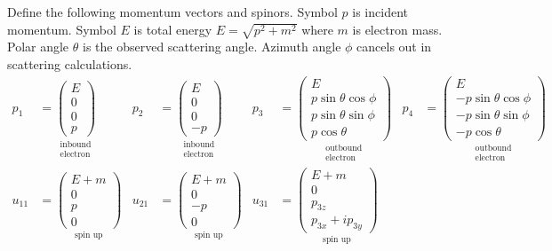 \documentclass[12pt]{article}
\begin{document}
Define the following momentum vectors and spinors.
Symbol $p$ is incident momentum.
Symbol $E$ is total energy $E=\sqrt{p^2+m^2}$ where $m$ is electron mass.
Polar angle $\theta$ is the observed scattering angle.
Azimuth angle $\phi$ cancels out in scattering calculations.
\begin{align*}
p_1&=
\underset{\substack{\text{inbound}\\\text{electron}}}
{
\begin{pmatrix}E\\0\\0\\p\end{pmatrix}
}
&
p_2&=
\underset{\substack{\text{inbound}\\\text{electron}}}
{
\begin{pmatrix}E\\0\\0\\-p\end{pmatrix}
}
&
p_3&=
\underset{\substack{\text{outbound}\\\text{electron}}}
{
\begin{pmatrix}
E\\
p\sin\theta\cos\phi\\
p\sin\theta\sin\phi\\
p\cos\theta
\end{pmatrix}
}
&
p_4&=
\underset{\substack{\text{outbound}\\\text{electron}}}
{
\begin{pmatrix}
E\\
-p\sin\theta\cos\phi\\
-p\sin\theta\sin\phi\\
-p\cos\theta
\end{pmatrix}
}
\\[1ex]
u_{11}&=
\underset{\text{spin up}}
{\begin{pmatrix}E+m\\0\\p\\0\end{pmatrix}}
&
u_{21}&=
\underset{\text{spin up}}
{\begin{pmatrix}E+m\\0\\-p\\0\end{pmatrix}}
&
u_{31}&=
\underset{\text{spin up}}
{\begin{pmatrix}E+m\\0\\p_{3z}\\p_{3x}+ip_{3y}\end{pmatrix}}

\end{align*}
\end{document}
